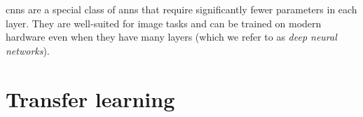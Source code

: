 \documentclass[../main.tex]{subfiles}
\begin{document}
\Glspl{cnn} are a special class of \glspl{ann} that require significantly fewer parameters in each layer.
They are well-suited for image tasks and can be trained on modern hardware even when they have many layers (which we refer to as \emph{deep neural networks}).


\section{Transfer learning}
\end{document}
